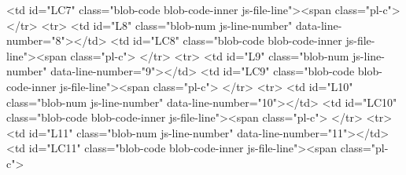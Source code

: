        <td id="LC7" class="blob-code blob-code-inner js-file-line"><span class="pl-c">%
      </tr>
      <tr>
        <td id="L8" class="blob-num js-line-number" data-line-number="8"></td>
        <td id="LC8" class="blob-code blob-code-inner js-file-line"><span class="pl-c">%
      </tr>
      <tr>
        <td id="L9" class="blob-num js-line-number" data-line-number="9"></td>
        <td id="LC9" class="blob-code blob-code-inner js-file-line"><span class="pl-c">%
      </tr>
      <tr>
        <td id="L10" class="blob-num js-line-number" data-line-number="10"></td>
        <td id="LC10" class="blob-code blob-code-inner js-file-line"><span class="pl-c">%
      </tr>
      <tr>
        <td id="L11" class="blob-num js-line-number" data-line-number="11"></td>
        <td id="LC11" class="blob-code blob-code-inner js-file-line"><span class="pl-c">%
